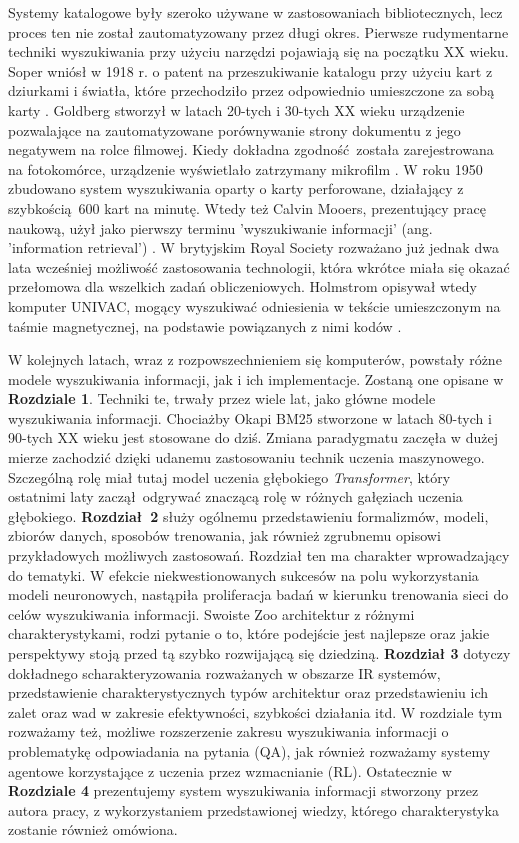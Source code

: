 Systemy katalogowe były szeroko używane w zastosowaniach bibliotecznych, lecz proces ten nie został zautomatyzowany przez długi okres. Pierwsze rudymentarne techniki wyszukiwania przy użyciu narzędzi pojawiają się na początku XX wieku. Soper wniósł w 1918 r. o patent na przeszukiwanie katalogu przy użyciu kart z dziurkami i światła, które przechodziło przez odpowiednio umieszczone za sobą karty \autocite{sandersoncroft2012}. Goldberg stworzył w latach 20-tych i 30-tych XX wieku urządzenie pozwalające na zautomatyzowane porównywanie strony dokumentu z jego negatywem na rolce filmowej. Kiedy dokładna zgodność została zarejestrowana na fotokomórce, urządzenie wyświetlało zatrzymany mikrofilm \autocite{sandersoncroft2012}. W roku 1950 zbudowano system wyszukiwania oparty o karty perforowane, działający z szybkością 600 kart na minutę. Wtedy też Calvin Mooers, prezentujący pracę naukową, użył jako pierwszy terminu 'wyszukiwanie informacji' (ang. 'information retrieval') \autocite{sandersoncroft2012}. W brytyjskim Royal Society rozważano już jednak dwa lata wcześniej możliwość zastosowania technologii, która wkrótce miała się okazać przełomowa dla wszelkich zadań obliczeniowych. Holmstrom opisywał wtedy komputer UNIVAC, mogący wyszukiwać odniesienia w tekście umieszczonym na taśmie magnetycznej, na podstawie powiązanych z nimi kodów \autocite{sandersoncroft2012}. \newline


W kolejnych latach, wraz z rozpowszechnieniem się komputerów, powstały różne modele wyszukiwania informacji, jak i ich implementacje. Zostaną one opisane w \textbf{Rozdziale 1}. Techniki te, trwały przez wiele lat, jako główne modele wyszukiwania informacji. Chociażby Okapi BM25 stworzone w latach 80-tych i 90-tych XX wieku jest stosowane do dziś. Zmiana paradygmatu zaczęła w dużej mierze zachodzić dzięki udanemu zastosowaniu technik uczenia maszynowego. Szczególną rolę miał tutaj model uczenia głębokiego \textit{Transformer}, który ostatnimi laty zaczął odgrywać znaczącą rolę w różnych gałęziach uczenia głębokiego. \textbf{Rozdział 2} służy ogólnemu przedstawieniu formalizmów, modeli, zbiorów danych, sposobów trenowania, jak również zgrubnemu opisowi przykładowych możliwych zastosowań. Rozdział ten ma charakter wprowadzający do tematyki. W efekcie niekwestionowanych sukcesów na polu wykorzystania modeli neuronowych, nastąpiła proliferacja badań w kierunku trenowania sieci do celów wyszukiwania informacji. Swoiste Zoo architektur z różnymi charakterystykami, rodzi pytanie o to, które podejście jest najlepsze oraz jakie perspektywy stoją przed tą szybko rozwijającą się dziedziną. \textbf{Rozdział 3} dotyczy dokładnego scharakteryzowania rozważanych w obszarze IR systemów, przedstawienie charakterystycznych typów architektur oraz przedstawieniu ich zalet oraz wad w zakresie efektywności, szybkości działania itd. W rozdziale tym rozważamy też, możliwe rozszerzenie zakresu wyszukiwania informacji o problematykę odpowiadania na pytania (QA), jak również rozważamy systemy agentowe korzystające z uczenia przez wzmacnianie (RL). Ostatecznie w \textbf{Rozdziale 4} prezentujemy system wyszukiwania informacji stworzony przez autora pracy, z wykorzystaniem przedstawionej  wiedzy, którego charakterystyka zostanie również omówiona.